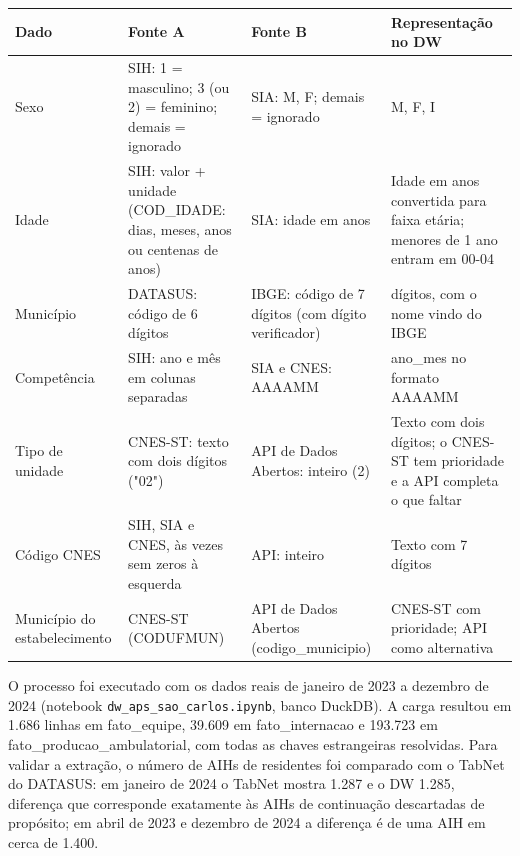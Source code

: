 \documentclass[12pt,a4paper]{article}
\begin{document}
{\small{}\begin{longtable}{|>{\raggedright\arraybackslash}p{}|>{\raggedright\arraybackslash}p{}|>{\raggedright\arraybackslash}p{}|>{\raggedright\arraybackslash}p{}|}\hline\rowcolor{azul}\color{white}\bfseries Dado & \color{white}\bfseries Fonte A & \color{white}\bfseries Fonte B & \color{white}\bfseries Representação no DW \\ \hline\endhead
Sexo & SIH: 1 = masculino; 3 (ou 2) = feminino; demais = ignorado & SIA: M, F; demais = ignorado & M, F, I \\ \hline
Idade & SIH: valor + unidade (COD\_\allowbreak{}IDADE: dias, meses, anos ou centenas de anos) & SIA: idade em anos & Idade em anos convertida para faixa etária; menores de 1 ano entram em 00-04 \\ \hline
Município & DATASUS: código de 6 dígitos & IBGE: código de 7 dígitos (com dígito verificador) & 6 dígitos, com o nome vindo do IBGE \\ \hline
Competência & SIH: ano e mês em colunas separadas & SIA e CNES: AAAAMM & ano\_\allowbreak{}mes no formato AAAAMM \\ \hline
Tipo de unidade & CNES-ST: texto com dois dígitos ("02") & API de Dados Abertos: inteiro (2) & Texto com dois dígitos; o CNES-ST tem prioridade e a API completa o que faltar \\ \hline
Código CNES & SIH, SIA e CNES, às vezes sem zeros à esquerda & API: inteiro & Texto com 7 dígitos \\ \hline
Município do estabelecimento & CNES-ST (CODUFMUN) & API de Dados Abertos (codigo\_\allowbreak{}municipio) & CNES-ST com prioridade; API como alternativa \\ \hline\end{longtable}}

O processo foi executado com os dados reais de janeiro de 2023 a dezembro de 2024 (notebook \texttt{dw\_\allowbreak{}aps\_\allowbreak{}sao\_\allowbreak{}carlos.ipynb}, banco DuckDB). A carga resultou em 1.686 linhas em fato\_\allowbreak{}equipe, 39.609 em fato\_\allowbreak{}internacao e 193.723 em fato\_\allowbreak{}producao\_\allowbreak{}ambulatorial, com todas as chaves estrangeiras resolvidas. Para validar a extração, o número de AIHs de residentes foi comparado com o TabNet do DATASUS: em janeiro de 2024 o TabNet mostra 1.287 e o DW 1.285, diferença que corresponde exatamente às AIHs de continuação descartadas de propósito; em abril de 2023 e dezembro de 2024 a diferença é de uma AIH em cerca de 1.400.
\end{document}
